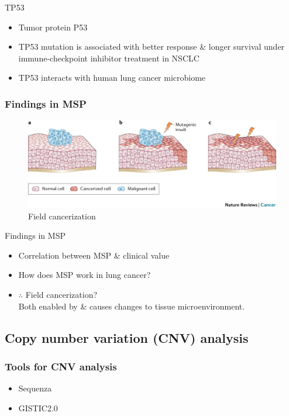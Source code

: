 \documentclass{beamer}
\begin{document}
\begin{frame}[allowframebreaks]
                \begin{block}{TP53}
                    \begin{itemize}
                        \item Tumor protein P53
                        \item TP53 mutation is associated with better response \& longer survival under immune-checkpoint inhibitor treatment in NSCLC \cite{TP53-01}
                        \item TP53 interacts with human lung cancer microbiome \cite{TP53-02}
                    \end{itemize}
                \end{block}
            \end{frame}

            \begin{frame}
                \frametitle{Findings in MSP}

                \begin{figure}
                    \includegraphics[width=0.6 \linewidth]{figures/LungCancer/cancerization.jpg}
                    \caption{Field cancerization \protect\cite{cancerization-01}}
                \end{figure}

                \begin{block}{Findings in MSP}
                    \begin{itemize}
                        \item Correlation between MSP \& clinical value
                        \item How does MSP work in lung cancer?
                        \item $\therefore$ Field cancerization? \\
                            Both enabled by \& causes changes to tissue microenvironment.
                    \end{itemize}
                \end{block}
            \end{frame}

        \subsection{Copy number variation (CNV) analysis}
            \begin{frame}
                \frametitle{Tools for CNV analysis}

                \begin{itemize}
                    \item Sequenza \cite{sequenza-01}
                    \item GISTIC2.0 \cite{gistic-01}
                \end{itemize}
            \end{frame}
\end{document}
